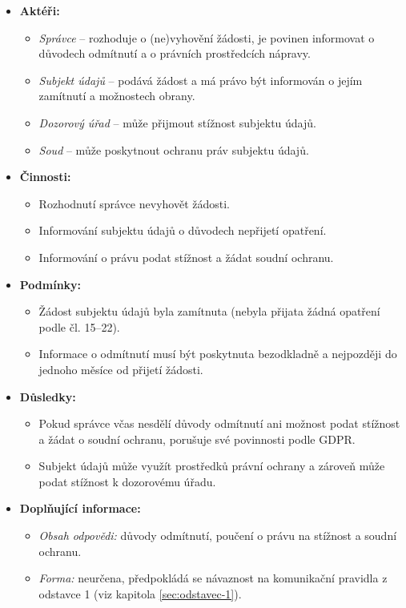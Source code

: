 \begin{itemize}
\item \textbf{Aktéři:}
  \begin{itemize}
    \item \textit{Správce} – rozhoduje o (ne)vyhovění žádosti, je povinen informovat o důvodech odmítnutí a o právních prostředcích nápravy.
    \item \textit{Subjekt údajů} – podává žádost a má právo být informován o jejím zamítnutí a možnostech obrany.
    \item \textit{Dozorový úřad} – může přijmout stížnost subjektu údajů.
    \item \textit{Soud} – může poskytnout ochranu práv subjektu údajů.
  \end{itemize}

\item \textbf{Činnosti:}
  \begin{itemize}
    \item Rozhodnutí správce nevyhovět žádosti.
    \item Informování subjektu údajů o důvodech nepřijetí opatření.
    \item Informování o právu podat stížnost a žádat soudní ochranu.
  \end{itemize}

\item \textbf{Podmínky:}
  \begin{itemize}
    \item Žádost subjektu údajů byla zamítnuta (nebyla přijata žádná opatření podle čl. 15–22).
    \item Informace o odmítnutí musí být poskytnuta bezodkladně a nejpozději do jednoho měsíce od přijetí žádosti.
  \end{itemize}

\item \textbf{Důsledky:}
  \begin{itemize}
    \item Pokud správce včas nesdělí důvody odmítnutí ani možnost podat stížnost a žádat o soudní ochranu, porušuje své povinnosti podle GDPR.
    \item Subjekt údajů může využít prostředků právní ochrany a zároveň může podat stížnost k dozorovému úřadu.
  \end{itemize}

\item \textbf{Doplňující informace:}
  \begin{itemize}
    \item \textit{Obsah odpovědi:} důvody odmítnutí, poučení o právu na stížnost a soudní ochranu.
    \item \textit{Forma:} neurčena, předpokládá se návaznost na komunikační pravidla z odstavce 1 (viz kapitola \ref{sec:odstavec-1}).
  \end{itemize}
\end{itemize}

